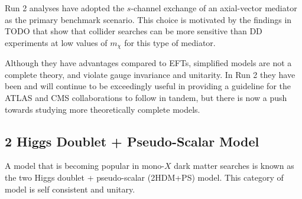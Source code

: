



Run 2 analyses have adopted the $s$-channel exchange of an axial-vector mediator as the primary benchmark scenario. This choice is motivated by the findings in TODO that show that collider searches can be more sensitive than DD experiments at low values of $m_\chi$ for this type of mediator. 

Although they have advantages compared to EFTs, simplified models are not a complete theory, and violate gauge invariance and unitarity. In Run 2 they have been and will continue to be exceedingly useful in providing a guideline for the ATLAS and CMS collaborations to follow in tandem, but there is now a push towards studying more theoretically complete models.

\subsection{2 Higgs Doublet + Pseudo-Scalar Model}

A model that is becoming popular in mono-$X$ dark matter searches is known as the two Higgs doublet + pseudo-scalar (2HDM+PS) model. This category of model is self consistent and unitary.

